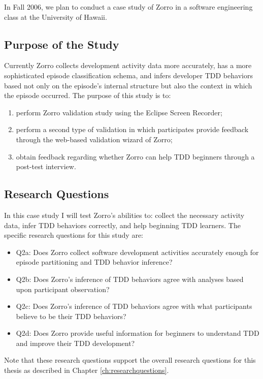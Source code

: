 In Fall 2006, we plan to conduct a case study of Zorro in a software
engineering class at the University of Hawaii.

\subsection{Purpose of the Study}
Currently Zorro collects development activity data more accurately,
has a more sophisticated episode classification schema, and infers
developer TDD behaviors based not only on the episode's internal
structure but also the context in which the episode occurred.
The purpose of this study is to:
\begin{enumerate}
\item perform Zorro validation study using the Eclipse Screen Recorder;
\item perform a second type of validation in which participates
provide feedback through the web-based validation wizard of Zorro;
\item obtain feedback regarding whether Zorro can help TDD
beginners through a post-test interview.
\end{enumerate}

\subsection{Research Questions}
In this case study I will test Zorro's abilities to: collect the
necessary activity data, infer TDD behaviors correctly, and help
beginning TDD learners. The specific research questions for this study
are:

\begin{itemize}
\item{Q2a: Does Zorro collect software development activities
accurately enough for episode partitioning and TDD behavior
inference?}
\item{Q2b: Does Zorro's inference of TDD behaviors agree with
analyses based upon participant observation?}
\item{Q2c: Does Zorro's inference of TDD behaviors agree with what
participants believe to be their TDD behaviors?}
\item{Q2d: Does Zorro provide useful information for beginners to
understand TDD and improve their TDD development?}
\end{itemize}

Note that these research questions support the overall research
questions for this thesis as described in Chapter
\ref{ch:researchquestions}.


